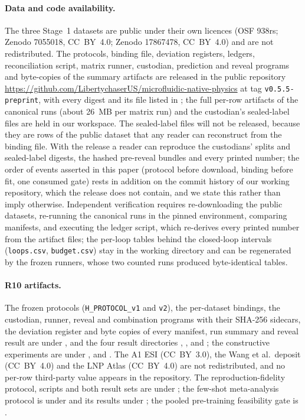 \documentclass[11pt,a4paper]{article}
\begin{document}
\paragraph{Data and code availability.} The three Stage~1 datasets are public under
their own licences (OSF 938rs; Zenodo 7055018, CC~BY~4.0; Zenodo 17867478,
CC~BY~4.0) and are not redistributed. The protocols, binding file, deviation
registers, ledgers, reconciliation script, matrix runner, custodian,
prediction and reveal programs and byte-copies of the summary artifacts are
released in the public repository \url{https://github.com/LibertychaserUS/microfluidic-native-physics} at tag
\texttt{v0.5.5-preprint}, with every digest and its file listed in
; the full per-row artifacts
of the canonical runs (about 26~MB per matrix run) and the custodian's
sealed-label files are held in our workspace. The sealed-label files
will not be released, because they are rows of the public dataset that any
reader can reconstruct from the binding file. With the release a reader can
reproduce the custodians' splits and sealed-label digests, the hashed
pre-reveal bundles and every printed number; the order of events asserted in
this paper (protocol before download, binding before fit, one consumed gate)
rests in addition on the commit history of our working repository, which the
release does not contain, and we state this rather than imply otherwise.
Independent verification requires re-downloading the public datasets, re-running the canonical runs in
the pinned environment, comparing manifests, and executing the ledger script,
which re-derives every printed number from the artifact files; the per-loop
tables behind the closed-loop intervals (\texttt{loops.csv}, \texttt{budget.csv})
stay in the working directory and can be regenerated by the frozen runners,
whose two counted runs produced byte-identical tables.

\paragraph{R10 artifacts.} The frozen protocols (\texttt{H\_PROTOCOL\_v1} and
\texttt{v2}), the per-dataset bindings, the custodian, runner, reveal and
combination programs with their SHA-256 sidecars, the deviation register and
byte copies of every manifest, run summary and reveal result are under
,  and the four result
directories , ,  and
; the constructive experiments are under
,  and .
The A1 ESI (CC~BY~3.0), the Wang et al.\ deposit (CC~BY~4.0) and the LNP
Atlas (CC~BY~4.0) are not redistributed, and no per-row third-party value
appears in the repository. The reproduction-fidelity protocol, scripts and both result sets are under ; the few-shot meta-analysis protocol is under  and its results under ; the pooled pre-training feasibility gate is .
\end{document}
